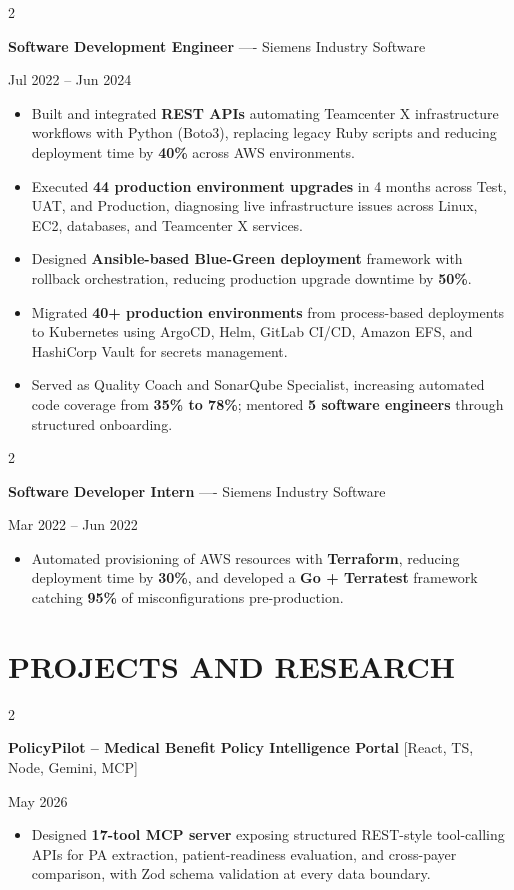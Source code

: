 \documentclass[10pt, letterpaper]{article}
\newenvironment{highlights}{
    \begin{itemize}[
        topsep=0.10 cm,
        parsep=0.06 cm,
        partopsep=0pt,
        itemsep=0.06 cm,
        leftmargin=12pt
    ]
}{
    \end{itemize}
}
\newenvironment{twocolentry}[2][]{
    \onecolentry
    \def\secondColumn{#2}
    \setcolumnwidth{\fill, 4.5 cm}
    \begin{paracol}{2}
}{
    \switchcolumn \raggedleft \secondColumn
    \end{paracol}
    \endonecolentry
}
\begin{document}
\vspace{0.15 cm}

\begin{twocolentry}{Jul 2022 -- Jun 2024}
\textbf{Software Development Engineer} ---- Siemens Industry Software
\end{twocolentry}
\begin{highlights}
  \item Built and integrated \textbf{REST APIs} automating Teamcenter X infrastructure workflows with Python (Boto3), replacing legacy Ruby scripts and reducing deployment time by \textbf{40\%} across AWS environments.
  \item Executed \textbf{44 production environment upgrades} in 4 months across Test, UAT, and Production, diagnosing live infrastructure issues across Linux, EC2, databases, and Teamcenter X services.
  \item Designed \textbf{Ansible-based Blue-Green deployment} framework with rollback orchestration, reducing production upgrade downtime by \textbf{50\%}.
  \item Migrated \textbf{40+ production environments} from process-based deployments to Kubernetes using ArgoCD, Helm, GitLab CI/CD, Amazon EFS, and HashiCorp Vault for secrets management.
  \item Served as Quality Coach and SonarQube Specialist, increasing automated code coverage from \textbf{35\% to 78\%}; mentored \textbf{5 software engineers} through structured onboarding.
\end{highlights}

\vspace{0.15 cm}

\begin{twocolentry}{Mar 2022 -- Jun 2022}
\textbf{Software Developer Intern} ---- Siemens Industry Software
\end{twocolentry}
\begin{highlights}
  \item Automated provisioning of AWS resources with \textbf{Terraform}, reducing deployment time by \textbf{30\%}, and developed a \textbf{Go + Terratest} framework catching \textbf{95\%} of misconfigurations pre-production.
\end{highlights}

\section{PROJECTS AND RESEARCH}
\begin{twocolentry}{May 2026}
\textbf{PolicyPilot -- Medical Benefit Policy Intelligence Portal} [React, TS, Node, Gemini, MCP]
\end{twocolentry}
\begin{highlights}
  \item Designed \textbf{17-tool MCP server} exposing structured REST-style tool-calling APIs for PA extraction, patient-readiness evaluation, and cross-payer comparison, with Zod schema validation at every data boundary.
\end{highlights}
\end{document}

